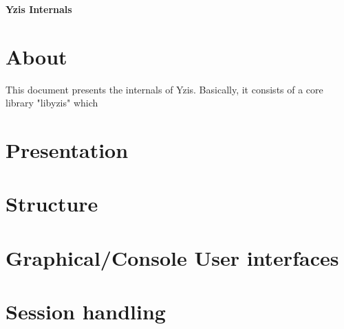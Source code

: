 
\begin{center}
\bf Yzis Internals
\end{center}

\tableofcontents

\newpage

\section{About}

This document presents the internals of Yzis.
Basically, it consists of a core library "libyzis" which 

\section{Presentation}
\section{Structure}
\section{Graphical/Console User interfaces}
\section{Session handling}
\section{}


